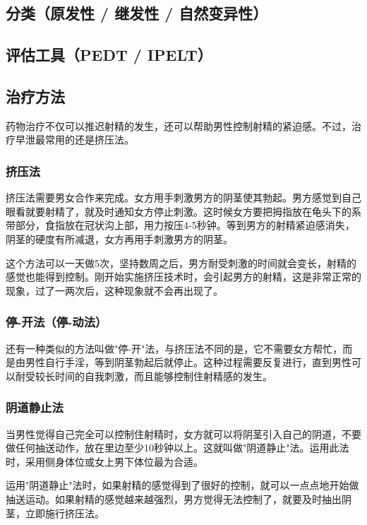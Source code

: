\subsection{分类（原发性 / 继发性 / 自然变异性）}
\subsection{评估工具（PEDT / IPELT）}
\subsection{治疗方法}

药物治疗不仅可以推迟射精的发生，还可以帮助男性控制射精的紧迫感。不过，治疗早泄最常用的还是挤压法。

\subsubsection{挤压法}

挤压法需要男女合作来完成。女方用手刺激男方的阴茎使其勃起。男方感觉到自己眼看就要射精了，就及时通知女方停止刺激。这时候女方要把拇指放在龟头下的系带部分，食指放在冠状沟上部，用力按压4-5秒钟。等到男方的射精紧迫感消失，阴茎的硬度有所减退，女方再用手刺激男方的阴茎。

这个方法可以一天做5次，坚持数周之后，男方耐受刺激的时间就会变长，射精的感觉也能得到控制。刚开始实施挤压技术时，会引起男方的射精，这是非常正常的现象，过了一两次后，这种现象就不会再出现了。

\subsubsection{停-开法（停-动法）}

还有一种类似的方法叫做"停-开"法，与挤压法不同的是，它不需要女方帮忙，而是由男性自行手淫，等到阴茎勃起后就停止。这种过程需要反复进行，直到男性可以耐受较长时间的自我刺激，而且能够控制住射精感的发生。

\subsubsection{阴道静止法}

当男性觉得自己完全可以控制住射精时，女方就可以将阴茎引入自己的阴道，不要做任何抽送动作，放在里边至少10秒钟以上。这就叫做"阴道静止"法。运用此法时，采用侧身体位或女上男下体位最为合适。

运用"阴道静止"法时，如果射精的感觉得到了很好的控制，就可以一点点地开始做抽送运动。如果射精的感觉越来越强烈，男方觉得无法控制了，就要及时抽出阴茎，立即施行挤压法。

